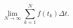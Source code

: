 \documentclass{article}
\begin{document}
\begin{huge}
$$\lim_{N \to \infty} \sum_{k=1}^N f(t_k) \Delta t.$$
\vspace{3pc}

\end{huge}
\end{document}
